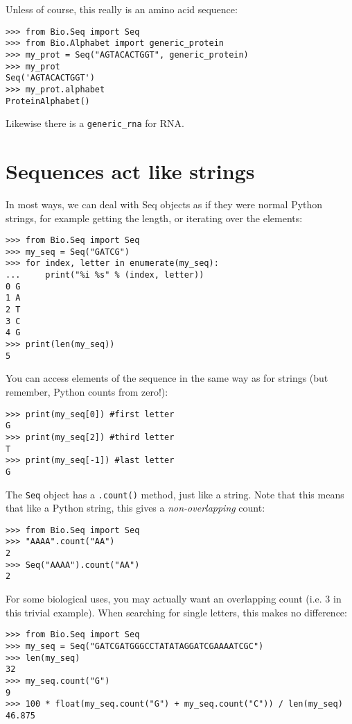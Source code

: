 Unless of course, this really is an amino acid sequence:

\begin{verbatim}
>>> from Bio.Seq import Seq
>>> from Bio.Alphabet import generic_protein
>>> my_prot = Seq("AGTACACTGGT", generic_protein)
>>> my_prot
Seq('AGTACACTGGT')
>>> my_prot.alphabet
ProteinAlphabet()
\end{verbatim}

Likewise there is a \verb|generic_rna| for RNA.

\section{Sequences act like strings}

In most ways, we can deal with Seq objects as if they were normal Python strings, for example getting the length, or iterating over the elements:

\begin{verbatim}
>>> from Bio.Seq import Seq
>>> my_seq = Seq("GATCG")
>>> for index, letter in enumerate(my_seq):
...     print("%i %s" % (index, letter))
0 G
1 A
2 T
3 C
4 G
>>> print(len(my_seq))
5
\end{verbatim}

You can access elements of the sequence in the same way as for strings (but remember, Python counts from zero!):

\begin{verbatim}
>>> print(my_seq[0]) #first letter
G
>>> print(my_seq[2]) #third letter
T
>>> print(my_seq[-1]) #last letter
G
\end{verbatim}

The \verb|Seq| object has a \verb|.count()| method, just like a string.
Note that this means that like a Python string, this gives a
\emph{non-overlapping} count:

\begin{verbatim}
>>> from Bio.Seq import Seq
>>> "AAAA".count("AA")
2
>>> Seq("AAAA").count("AA")
2
\end{verbatim}

\noindent For some biological uses, you may actually want an overlapping count
(i.e. $3$ in this trivial example). When searching for single letters, this
makes no difference:

\begin{verbatim}
>>> from Bio.Seq import Seq
>>> my_seq = Seq("GATCGATGGGCCTATATAGGATCGAAAATCGC")
>>> len(my_seq)
32
>>> my_seq.count("G")
9
>>> 100 * float(my_seq.count("G") + my_seq.count("C")) / len(my_seq)
46.875
\end{verbatim}

